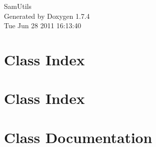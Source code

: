 \documentclass[a4paper]{book}
\begin{document}
\hypersetup{pageanchor=false}
\begin{titlepage}
\vspace*{7cm}
\begin{center}
{\Large SamUtils }\\
\vspace*{1cm}
{\large Generated by Doxygen 1.7.4}\\
\vspace*{0.5cm}
{\small Tue Jun 28 2011 16:13:40}\\
\end{center}
\end{titlepage}
\clearemptydoublepage
{}
\tableofcontents
\clearemptydoublepage
{}
\hypersetup{pageanchor=true}
\chapter{Class Index}

\chapter{Class Index}

\chapter{Class Documentation}

























\printindex
\end{document}
